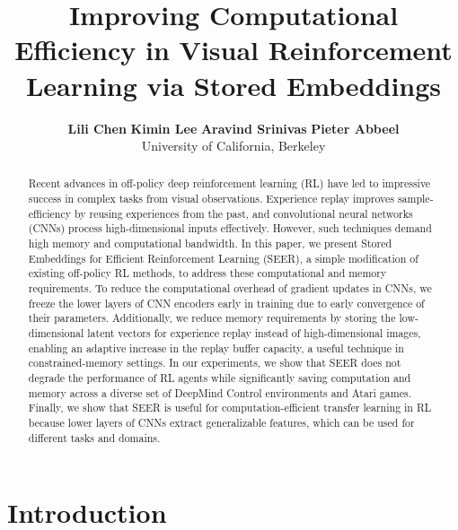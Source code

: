\documentclass{article}
\title{Improving Computational Efficiency in Visual Reinforcement Learning via Stored Embeddings}
\author{\qquad
  \textbf{Lili Chen}
  \qquad
  \textbf{Kimin Lee}
  \qquad
  \textbf{Aravind Srinivas}
  \qquad
  \textbf{Pieter Abbeel}
  \qquad
  \\
  University of California, Berkeley \vspace{.1em}\\
}
\begin{document}
\maketitle

























\begin{abstract}



Recent advances in off-policy deep reinforcement learning (RL) have led to impressive success in complex tasks from visual observations. Experience replay improves sample-efficiency by reusing experiences from the past, and convolutional neural networks (CNNs) process high-dimensional inputs effectively. However, such techniques demand high memory and computational bandwidth. In this paper, we present Stored Embeddings for Efficient Reinforcement Learning (SEER), a simple modification of existing off-policy RL methods, to address these computational and memory requirements.
To reduce the computational overhead of gradient updates in CNNs, we freeze the lower layers of CNN encoders early in training due to early convergence of their parameters. Additionally, we reduce memory requirements by storing the low-dimensional latent vectors for experience replay instead of high-dimensional images, enabling an adaptive increase in the replay buffer capacity, a useful technique in constrained-memory settings. In our experiments, we show that SEER does not degrade the performance of RL agents while significantly saving computation and memory across a diverse set of DeepMind Control environments and Atari games. Finally, we show that SEER is useful for computation-efficient transfer learning in RL because lower layers of CNNs extract generalizable features, which can be used for different tasks and domains. 
\end{abstract}

\section{Introduction}
\end{document}
